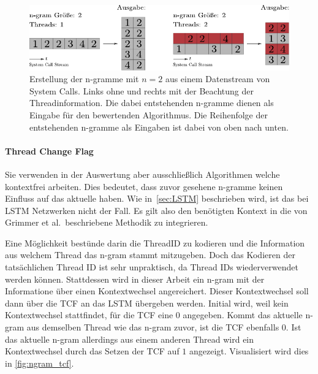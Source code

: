                 \begin{figure}
                    \includegraphics[width=\textwidth]{images/ngram.pdf}
                    \caption{Erstellung der n-gramme mit $n=2$ aus einem Datenstream von System Calls.
                        Links ohne und rechts mit der Beachtung der Threadinformation.
                        Die dabei entstehenden n-gramme dienen als Eingabe für den bewertenden Algorithmus.
                        Die Reihenfolge der entstehenden n-gramme als Eingaben ist dabei von oben nach unten.
                    }\label{fig:ngram_thread}
                \end{figure}

            \paragraph{Thread Change Flag}
                Sie verwenden in der Auswertung aber ausschließlich Algorithmen welche kontextfrei arbeiten.
                Dies bedeutet, dass zuvor gesehene n-gramme keinen Einfluss auf das aktuelle haben.
                Wie in~\autoref{sec:LSTM} beschrieben wird, ist das bei \ac{LSTM} Netzwerken nicht der Fall.
                Es gilt also den benötigten Kontext in die von Grimmer et al.\ beschriebene Methodik zu integrieren.

                Eine Möglichkeit bestünde darin die ThreadID zu kodieren und die Information aus welchem Thread das n-gram stammt mitzugeben.
                Doch das Kodieren der tatsächlichen Thread ID ist sehr unpraktisch, da Thread IDs wiederverwendet werden können.
                Stattdessen wird in dieser Arbeit ein n-gram mit der Informatione über einen Kontextwechsel angereichert. 
                Dieser Kontextwechsel soll dann über die \ac{TCF} an das \ac{LSTM} übergeben werden.
                Initial wird, weil kein Kontextwechsel stattfindet, für die \ac{TCF} eine $0$ angegeben.
                Kommt das aktuelle n-gram aus demselben Thread wie das n-gram zuvor, ist die \ac{TCF} ebenfalls $0$.
                Ist das aktuelle n-gram allerdings aus einem anderen Thread wird ein Kontextwechsel durch das Setzen der \ac{TCF} auf $1$ angezeigt.
                Visualisiert wird dies in \autoref{fig:ngram_tcf}.

